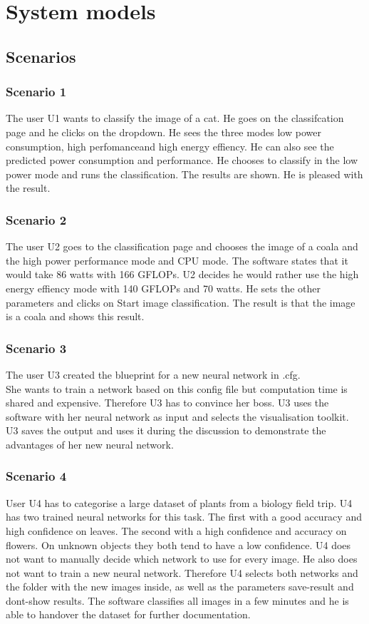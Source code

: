 \documentclass[parskip=full]{scrartcl}
\begin{document}
\section{System models}
\subsection{Scenarios}
\subsubsection{Scenario 1}
The user U1 wants to classify the image of a cat. He goes on the classifcation page and he clicks on the dropdown. He sees the three modes \glqq low power consumption\grqq, \glqq high perfomance\grqq and \glqq high energy effiency\grqq. He can also see the predicted power consumption and performance. He chooses to classify in the low power mode and runs the classification. The results are shown. He is pleased with the result.
\subsubsection{Scenario 2}
The user U2 goes to the classification page and chooses the image of a coala and the high power performance mode and CPU mode. The software states that it would take 86 watts with 166 GFLOPs. U2 decides he would rather use the high energy effiency mode with 140 GFLOPs and 70 watts. He sets the other parameters and clicks on Start image classification. The result is that the image is a coala and shows this result. 
\subsubsection{Scenario 3}
The user U3 created the blueprint for a new neural network in .cfg.\\
She wants to train a network based on this config file but computation time is shared and expensive. Therefore U3 has to convince her boss.
U3 uses the software with her neural network as input and selects the visualisation toolkit.\\
U3 saves the output and uses it during the discussion to demonstrate the advantages of her new neural network.
\clearpage
\subsubsection{Scenario 4}
User U4 has to categorise a large dataset of plants from a biology field trip. U4 has two trained neural networks for this task. The first with a good accuracy and high confidence on leaves. The second with a high confidence and accuracy on flowers. On unknown objects they both tend to have a low confidence. U4 does not want to manually decide which network to use for every image. He also does not want to train a new neural network. Therefore U4 selects both networks and the folder with the new images inside, as well as the parameters save-result and dont-show results. The software classifies all images in a few minutes and he is able to handover the dataset for further documentation.
\end{document}
